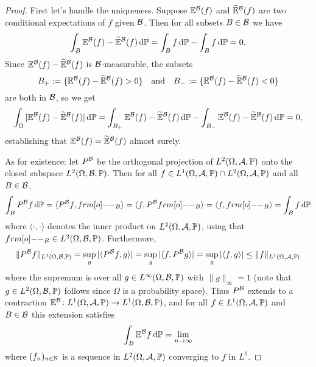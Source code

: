 \begin{proof} %
  First let's handle the uniqueness.
  Suppose $\mathbb{E}^{\mathcal{B}}(f)$ and $\widetilde{\mathbb{E}}^{\mathcal{B}}(f)$ are two conditional expectations of $f$ given $\mathcal{B}$.
  Then for all subsets $B \in \mathcal{B}$ we have
  \begin{equation*}
    \int_B \mathbb{E}^{\mathcal{B}}(f) - \widetilde{\mathbb{E}}^{\mathcal{B}}(f) \, \mathrm{d}\mathbb{P} = \int_B f \, \mathrm{d}\mathbb{P} - \int_B f \, \mathrm{d}\mathbb{P} = 0.
  \end{equation*}
  Since $\mathbb{E}^{\mathcal{B}}(f) - \widetilde{\mathbb{E}}^{\mathcal{B}}(f)$ is $\mathcal{B}$-measurable, the subsets
  \begin{equation*}
    B_+ := \{\mathbb{E}^{\mathcal{B}}(f) - \widetilde{\mathbb{E}}^{\mathcal{B}}(f) > 0\} \quad \text{and} \quad B_- := \{\mathbb{E}^{\mathcal{B}}(f) - \widetilde{\mathbb{E}}^{\mathcal{B}}(f) < 0\}
  \end{equation*}
  are both in $\mathcal{B}$, so we get
  \begin{equation*}
    \int_\Omega | \mathbb{E}^{\mathcal{B}}(f) - \widetilde{\mathbb{E}}^{\mathcal{B}}(f) | \, \mathrm{d}\mathbb{P}
    = \int_{B_+}  \mathbb{E}^{\mathcal{B}}(f) - \widetilde{\mathbb{E}}^{\mathcal{B}}(f) \, \mathrm{d}\mathbb{P} -  \int_{B_-}  \mathbb{E}^{\mathcal{B}}(f) - \widetilde{\mathbb{E}}^{\mathcal{B}}(f) \, \mathrm{d}\mathbb{P} 
    = 0,
  \end{equation*}
  establishing that $\mathbb{E}^{\mathcal{B}}(f) = \widetilde{\mathbb{E}}^{\mathcal{B}}(f)$ almost surely.

  As for existence: let $P^{\mathcal{B}}$ be the orthogonal projection of $L^2(\Omega, \mathcal{A}, \mathbb{P})$ onto the closed subspace $L^2(\Omega, \mathcal{B}, \mathbb{P})$.
  Then for all $f \in L^1(\Omega, \mathcal{A}, \mathbb{P}) \cap L^2(\Omega, \mathcal{A}, \mathbb{P})$ and all $B \in \mathcal{B}$,
  \begin{equation}
    \int_B P^{\mc{B}} f \, \dd\P = \langle P^{\mc{B}} f, \1_{B} \rangle = \langle f, P^{\mc{B}} \1_{B} \rangle = \langle f, \1_{B} \rangle = \int_B f \, \dd\P
  \end{equation}
  where $\langle \cdot, \cdot \rangle$ denotes the inner product on $L^2(\Omega, \mathcal{A}, \mathbb{P})$, using that $\1_{B} \in L^2(\Omega, \mc{B}, \P)$.
  Furthermore, 
  \begin{equation*}
    \|P^{\mathcal{B}} f \|_{L^1(\Omega, \mathcal{B}, \mathbb{P})} = \sup_{g} |\langle P^{\mathcal{B}} f, g \rangle|
    = \sup_{g} |\langle f, P^{\mathcal{B}} g \rangle|
    = \sup_{g} |\langle f, g \rangle| 
    \leq \|f\|_{L^1(\Omega, \mathcal{A}, \mathbb{P})}
  \end{equation*}
  where the supremum is over all $g \in L^\infty(\Omega, \mathcal{B}, \mathbb{P})$ with $\|g\|_\infty = 1$ (note that $g \in L^2(\Omega, \mathcal{B}, \mathbb{P})$ follows since $\Omega$ is a probability space).
  Thus $P^{\mathcal{B}}$ extends to a contraction $\mathbb{E}^{\mathcal{B}} \colon L^1(\Omega, \mathcal{A}, \mathbb{P}) \rightarrow L^1(\Omega, \mathcal{B}, \mathbb{P})$, and for all $f \in L^1(\Omega, \mathcal{A}, \mathbb{P})$ and $B \in \mathcal{B}$ this extension satisfies
  \begin{equation*}
    \begin{aligned}
      \int_B \mathbb{E}^{\mathcal{B}}f \, \mathrm{d}\mathbb{P} = \lim_{n \to \infty} 
    \end{aligned}
  \end{equation*}
  where $(f_n)_{n \in \mathbb{N}}$ is a sequence in $L^2(\Omega, \mathcal{A}, \mathbb{P})$ converging to $f$ in $L^1$.
\end{proof}

